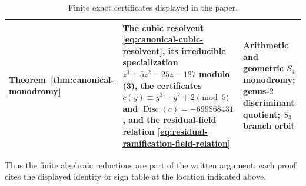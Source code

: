 \begin{table}[H]
\begin{tabular}{>{\raggedright\arraybackslash}p{}>{\raggedright\arraybackslash}p{}>{\raggedright\arraybackslash}p{}}
Theorem~\ref{thm:canonical-monodromy} & The cubic resolvent \eqref{eq:canonical-cubic-resolvent}, its irreducible specialization \(z^3+5z^2-25z-127\) modulo (3), the certificates \(c(y)\equiv y^3+y^2+2\pmod 5\) and \(\operatorname{Disc}(c)=-699868431\), and the residual-field relation \eqref{eq:residual-ramification-field-relation} & Arithmetic and geometric \(S_4\) monodromy; genus-$2$ discriminant quotient; \(S_3\) branch orbit\\
\bottomrule
\end{tabular}
\caption{Finite exact certificates displayed in the paper.}
\label{tab:exact-certificates}
\end{table}

Thus the finite algebraic reductions are part of the written argument: each proof cites the displayed identity or sign table at the location indicated above.
